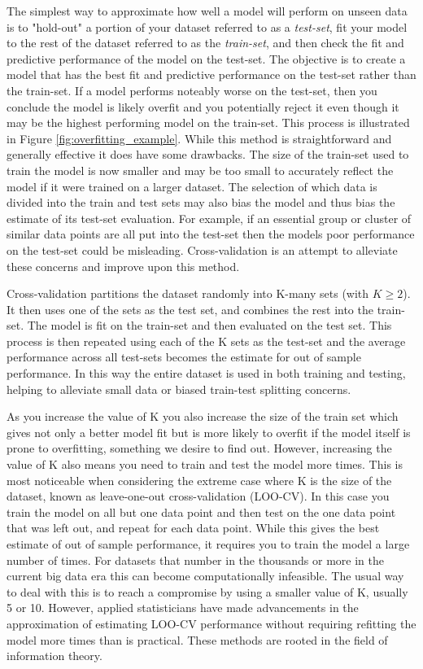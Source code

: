 The simplest way to approximate how well a model will perform on unseen data is to "hold-out" a portion of your dataset referred to as a \textit{test-set}, fit your model to the rest of the dataset referred to as the \textit{train-set}, and then check the fit and predictive performance of the model on the test-set. The objective is to create a model that has the best fit and predictive performance on the test-set rather than the train-set. If a model performs noteably worse on the test-set, then you conclude the model is likely overfit and you potentially reject it even though it may be the highest performing model on the train-set. This process is illustrated in Figure \ref{fig:overfitting_example}.  While this method is straightforward and generally effective it does have some drawbacks. The size of the train-set used to train the model is now smaller and may be too small to accurately reflect the model if it were trained on a larger dataset. The selection of which data is divided into the train and test sets may also bias the model and thus bias the estimate of its test-set evaluation. For example, if an essential group or cluster of similar data points are all put into the test-set then the models poor performance on the test-set could be misleading. Cross-validation is an attempt to alleviate these concerns and improve upon this method.

Cross-validation partitions the dataset randomly into K-many sets (with $K \geq 2$). It then uses one of the sets as the test set, and combines the rest into the train-set. The model is fit on the train-set and then evaluated on the test set. This process is then repeated using each of the K sets as the test-set and the average performance across all test-sets becomes the estimate for out of sample performance. In this way the entire dataset is used in both training and testing, helping to alleviate small data or biased train-test splitting concerns.

As you increase the value of K you also increase the size of the train set which gives not only a better model fit but is more likely to overfit if the model itself is prone to overfitting, something we desire to find out. However, increasing the value of K also means you need to train and test the model more times. This is most noticeable when considering the extreme case where K is the size of the dataset, known as leave-one-out cross-validation (LOO-CV). In this case you train the model on all but one data point and then test on the one data point that was left out, and repeat for each data point. While this gives the best estimate of out of sample performance, it requires you to train the model a large number of times. For datasets that number in the thousands or more in the current big data era this can become computationally infeasible. The usual way to deal with this is to reach a compromise by using a smaller value of K, usually 5 or 10. However, applied statisticians have made advancements in the approximation of estimating LOO-CV performance without requiring refitting the model more times than is practical. These methods are rooted in the field of information theory.

